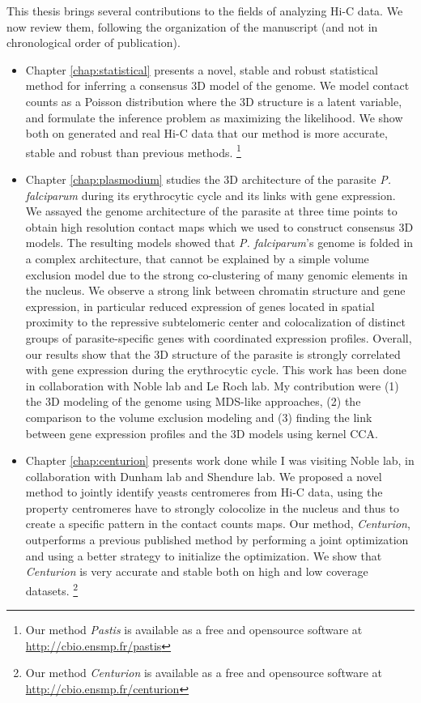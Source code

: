 This thesis brings several contributions to the fields of analyzing Hi-C data.
We now review them, following the organization of the manuscript (and not in
chronological order of publication).

\begin{itemize}

\item Chapter \ref{chap:statistical} presents a novel, stable and robust
statistical method for inferring a consensus 3D model of the genome. We model
contact counts as a Poisson distribution where the 3D structure is a latent
variable, and formulate the inference problem as maximizing the likelihood. We
show both on generated and real Hi-C data that our method is more accurate,
stable and robust than previous methods. \footnote{Our method \textit{Pastis}
is available as a free and opensource software at
\url{http://cbio.ensmp.fr/pastis}}

\item Chapter \ref{chap:plasmodium} studies the 3D architecture of the
parasite {\em P. falciparum} during its erythrocytic cycle and its links with
gene expression. We assayed the genome architecture of the parasite at three
time points to obtain high resolution contact maps which we used to construct
consensus 3D models. The resulting models showed that {\em P. falciparum}'s
genome is folded in a complex architecture, that cannot be explained by a
simple volume exclusion model due to the strong co-clustering of many genomic
elements in the nucleus. We observe a strong link between chromatin structure
and gene expression, in particular reduced expression of genes located in
spatial proximity to the repressive subtelomeric center and colocalization of
distinct groups of parasite-specific genes with coordinated expression
profiles. Overall, our results show that the 3D structure of the parasite is
strongly correlated with gene expression during the erythrocytic cycle. This
work has been done in collaboration with Noble lab and Le Roch lab. My
contribution were (1) the 3D modeling of the genome using MDS-like approaches,
(2) the comparison to the volume exclusion modeling and (3) finding the link
between gene expression profiles and the 3D models using kernel CCA.

\item Chapter \ref{chap:centurion} presents work done while I was visiting
Noble lab, in collaboration with Dunham lab and Shendure lab. We proposed a
novel method to jointly identify yeasts centromeres from Hi-C data, using the
property centromeres have to strongly colocolize in the nucleus and thus to
create a specific pattern in the contact counts maps. Our method,
\textit{Centurion}, outperforms a previous published method by performing a
joint optimization and using a better strategy to initialize the optimization.
We show that \textit{Centurion} is very accurate and stable both on high and
low coverage datasets. \footnote{Our method \textit{Centurion} is available as
a free and opensource software at \url{http://cbio.ensmp.fr/centurion}}
\end{itemize}
